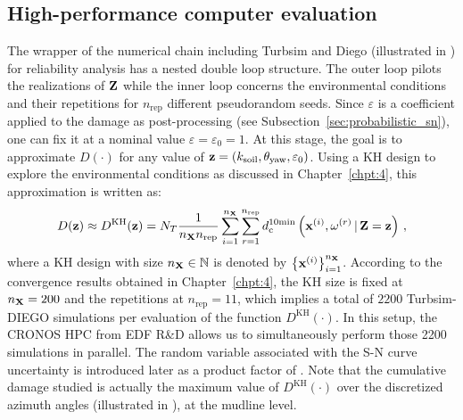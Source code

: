 \subsection{High-performance computer evaluation}
The wrapper of the numerical chain including Turbsim and Diego (illustrated in ) for reliability analysis has a nested double loop structure. 
The outer loop pilots the realizations of ${\bf Z}$ while the inner loop concerns the environmental conditions and their repetitions for $n_{\mathrm{rep}}$ different pseudorandom seeds. 
Since $\varepsilon$ is a coefficient applied to the damage as post-processing (see Subsection~\ref{sec:probabilistic_sn}), one can fix it at a nominal value $\varepsilon = \varepsilon_0 =1$. 
At this stage, the goal is to approximate $D(\cdot)$ for any value of ${\bf z} = (k_{\mathrm{soil}}, \theta_{\mathrm{yaw}}, \varepsilon_0)$. 
Using a KH design to explore the environmental conditions as discussed in Chapter~\ref{chpt:4}, this approximation is written as: 
\begin{equation}
    D({\bf z}) \approx D^{\mathrm{KH}}({\bf z}) = N_T \frac{1}{n_{\bf X} n_{\mathrm{rep}}} \sum_{i=1}^{n_{\bf X}} \sum_{r=1}^{n_{\mathrm{rep}}} d_{\mathrm{c}}^{10\mathrm{min}}\left({\bf x}^{(i)}, \omega^{(r)} \,|\, {\bf Z} = {\bf z}\right)\, ,
    \label{eq:hpc_cumulated_damage}
\end{equation}
where a KH design with size $n_{\bf X} \in \mathbb{N}$ is denoted by $\left\{{\bf x}^{(i)}\right\}_{i=1}^{n_{\bf X}}$. 
According to the convergence results obtained in Chapter~\ref{chpt:4}, the KH size is fixed at $n_{\bf X}=200$ and the repetitions at $n_{\mathrm{rep}}=11$, which implies a total of $2200$ Turbsim-DIEGO simulations per evaluation of the function $D^{\mathrm{KH}}(\cdot)$. 
In this setup, the CRONOS HPC from EDF R\&D allows us to simultaneously perform those 2200 simulations in parallel. 
The random variable associated with the S-N curve uncertainty is introduced later as a product factor of . 
Note that the cumulative damage studied is actually the maximum value of $D^{\mathrm{KH}}(\cdot)$ over the discretized azimuth angles (illustrated in ), at the mudline level. 


